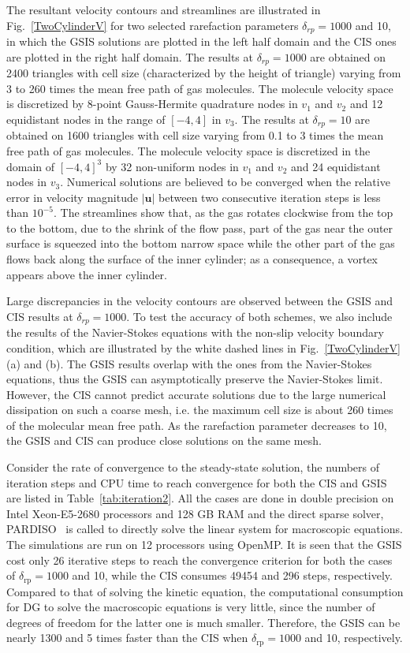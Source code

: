 The resultant velocity contours and streamlines are illustrated in Fig.~\ref{TwoCylinderV} for two selected rarefaction parameters $\delta_{rp}=1000$ and 10, in which the GSIS solutions are plotted in the left half domain and the CIS ones are plotted in the right half domain. The results at $\delta_{rp}=1000$ are obtained on 2400 triangles with cell size (characterized by the height of triangle) varying from 3 to 260 times the mean free path of gas molecules. The molecule velocity space is discretized by 8-point Gauss-Hermite quadrature nodes in $v_1$ and $v_2$ and 12 equidistant nodes in the range of $[-4,4]$ in $v_3$. The results at $\delta_{rp}=10$ are obtained on 1600 triangles with cell size varying from 0.1 to 3 times the mean free path of gas molecules. The molecule velocity space is discretized in the domain of $[-4,4]^3$ by 32 non-uniform nodes in $v_1$ and $v_2$ and 24 equidistant nodes in $v_3$. Numerical solutions are believed to be converged when the relative error in velocity magnitude $|\bm{u}|$ between two consecutive iteration steps is less than $10^{-5}$. The streamlines show that, as the gas rotates clockwise from the top to the bottom, due to the shrink of the flow pass, part of the gas near the outer surface is squeezed into the bottom narrow space while the other part of the gas flows back along the surface of the inner cylinder; as a consequence, a vortex appears above the inner cylinder. 


Large discrepancies in the velocity contours are observed between the GSIS and CIS results at $\delta_{rp}=1000$. To test the accuracy of both schemes, we also include the results of the Navier-Stokes equations with the non-slip velocity boundary condition, which are illustrated by the white dashed lines in Fig.~\ref{TwoCylinderV}(a) and (b). The GSIS results overlap with the ones from the Navier-Stokes equations, thus the GSIS can asymptotically preserve the Navier-Stokes limit. However, the CIS cannot predict accurate solutions due to the large numerical dissipation on such a coarse mesh, i.e. the maximum cell size is about 260 times of the molecular mean free path.  As the rarefaction parameter decreases to 10, the GSIS and CIS can produce close solutions on the same mesh. 

Consider the rate of convergence to the steady-state solution, the numbers of iteration steps and CPU time to reach convergence for both the CIS and GSIS are listed in Table~\ref{tab:iteration2}. All the cases are done in double precision on Intel Xeon-E5-2680 processors and 128 GB RAM and the direct sparse solver, PARDISO~\cite{pardiso} is called to directly solve the linear system for macroscopic equations. The simulations are run on 12 processors using OpenMP. It is seen that the GSIS cost only 26 iterative steps to reach the convergence criterion for both the cases of $\delta_\text{rp}=1000$ and 10, while the CIS consumes 49454 and 296 steps, respectively. Compared to that of solving the kinetic equation, the computational consumption for DG to solve the macroscopic equations is very little, since the number of degrees of freedom for the latter one is much smaller. Therefore, the GSIS can be nearly 1300 and 5 times faster than the CIS when $\delta_\text{rp}=1000$ and 10, respectively.


